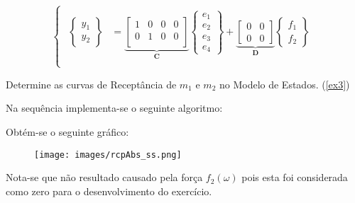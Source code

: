 \documentclass{article}
\begin{document}
\begin{resolution}
\begin{equation}
\begin{cases}
\begin{aligned}
            \begin{Bmatrix} y_1\\ y_2 \end{Bmatrix} &=
            \underbrace{
                \begin{bmatrix}
                    1 & 0 & 0 & 0\\
                    0 & 1 & 0 & 0\\
                \end{bmatrix}}_{\mathbf{C}}
            \begin{Bmatrix} e_{1}\\ e_{2}\\ e_{3}\\ e_{4} \end{Bmatrix} + 
            \underbrace{\begin{bmatrix} 0 & 0\\ 0 & 0 \end{bmatrix}}_{\mathbf{D}}
            \begin{Bmatrix} f_1\\f_2 \end{Bmatrix}\\
        \end{aligned}
        \end{cases}
    \end{equation}
\end{resolution}


\newpage\begin{exercise}\label{ex10}
    Determine as curvas de Receptância de $m_1$ e $m_2$ no Modelo de Estados. (\ref{ex3})
\end{exercise}
\begin{resolution}
    Na sequência implementa-se o seguinte algoritmo:
    \begin{scriptsize}
        \myMatlab
    \end{scriptsize}
    Obtém-se o seguinte gráfico:
    \begin{figure}[H]
        \centering
        \texttt{[image: images/rcpAbs\_ss.png]}
    \end{figure}
    Nota-se que não resultado causado pela força $f_2(\omega)$ pois esta foi considerada como zero para o desenvolvimento do exercício.
\end{resolution}
\end{document}
